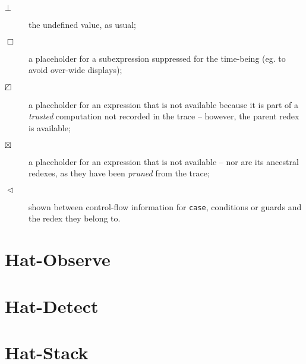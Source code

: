 \documentclass[12pt]{article}
\newcommand{\emptyBox}{\Box}
\newcommand{\dashedBox}{\Box\hspace{-9pt}\angle}
\newcommand{\crossBox}{\boxtimes}
\newcommand{\within}{\vartriangleleft}
\begin{document}
\begin{description}

\item[$\bot$]
the undefined value, as usual;

\item[$\emptyBox$]
a placeholder for a subexpression suppressed for
the time-being (eg. to avoid over-wide displays);

\item[$\dashedBox$]
a placeholder for an expression that
is not available because it is part of a
\emph{trusted} computation not recorded in
the trace -- however, the parent redex
is available; 
    
\item[$\crossBox$]
a placeholder for an expression that
is not available -- nor are its ancestral
redexes, as they have been
\emph{pruned} from the trace;

\item[$\within$]
shown between control-flow information for \texttt{case}, conditions or guards and the redex they belong to.
\end{description}


\section{Hat-Observe}


\section{Hat-Detect}


\section{Hat-Stack}

\end{document}
